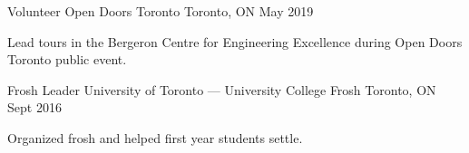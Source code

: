

\begin{cventries}

  \cventry
    {Volunteer} %
    {Open Doors Toronto} %
    {Toronto, ON} %
    {May 2019} %
    {
    \begin{cvitems} %
        \item {Lead tours in the Bergeron Centre for Engineering Excellence during Open Doors Toronto public event.}
    \end{cvitems}
    }

  \cventry
    {Frosh Leader} %
    {University of Toronto — University College Frosh} %
    {Toronto, ON} %
    {Sept 2016} %
    {
    \begin{cvitems} %
        \item {Organized frosh and helped first year students settle.}
    \end{cvitems}
    }
    

\end{cventries}

